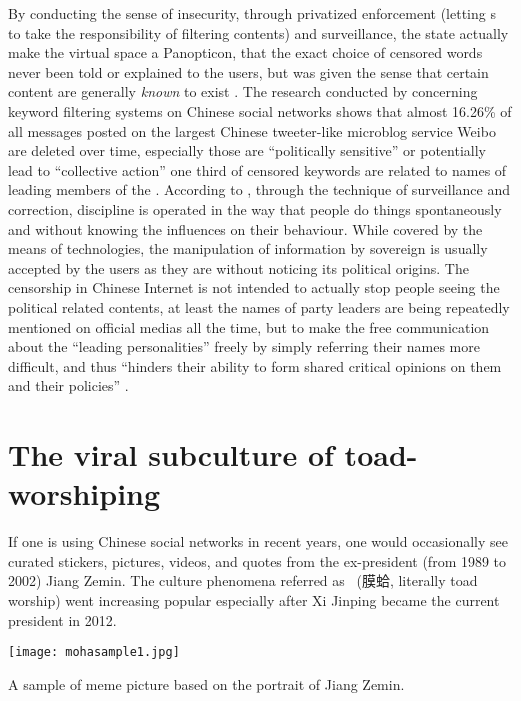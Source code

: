 By conducting the sense of insecurity, through privatized enforcement (letting \isp s to take the responsibility of filtering contents) and surveillance, the state actually make the virtual space a Panopticon, that the exact choice of censored words never been told or explained to the users, but was given the sense that certain content are generally \textit{known} to exist \citep{vuori_lexicon_2015,boyle_foucault_1997}. The research conducted by \citet{vuori_lexicon_2015} concerning keyword filtering systems on Chinese social networks shows that almost 16.26\% of all messages posted on the largest Chinese tweeter-like microblog service Weibo are deleted over time, especially those are ``politically sensitive'' or potentially lead to ``collective action'' one third of censored keywords are related to names of leading members of the \cpc. According to \citet{foucault_security_2007}, through the technique of surveillance and correction, discipline is operated in the way that people do things spontaneously and without knowing the influences on their behaviour. While covered by the means of technologies, the manipulation of information by sovereign is usually accepted by the users as they are without noticing its political origins. The censorship in Chinese Internet is not intended to actually stop people seeing the political related contents, at least the names of party leaders are being repeatedly mentioned on official medias all the time, but to make the free communication about the ``leading personalities'' freely by simply referring their names more difficult, and thus ``hinders their ability to form shared critical opinions on them and their policies'' \citep[p.~413]{vuori_lexicon_2015}.

\section{The viral subculture of toad-worshiping}\label{sec:moha}

If one is using Chinese social networks in recent years, one would occasionally see curated stickers, pictures, videos, and quotes from the ex-president (from 1989 to 2002) Jiang Zemin. The culture phenomena referred as \moha\ (膜蛤, literally toad worship) went increasing popular especially after Xi Jinping became the current president in 2012.
\begin{marginfigure}
	\texttt{[image: mohasample1.jpg]}
	\caption[A sample of meme picture based on the portrait of Jiang Zemin]{A sample of meme picture based on the portrait of Jiang Zemin.}
	\label{fig:mohasample1}
\end{marginfigure}


